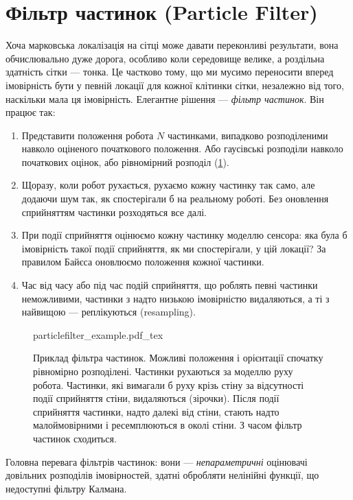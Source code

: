 \section{Фільтр частинок (Particle Filter)}
Хоча марковська локалізація на сітці може давати переконливі результати, вона обчислювально дуже дорога, особливо коли середовище велике, а роздільна здатність сітки — тонка. Це частково тому, що ми мусимо переносити вперед імовірність бути у певній локації для кожної клітинки сітки, незалежно від того, наскільки мала ця імовірність. Елегантне рішення — \emph{фільтр частинок}. Він працює так:
\begin{enumerate}
\item Представити положення робота $N$ частинками, випадково розподіленими навколо оціненого початкового положення. Або гаусівські розподіли навколо початкових оцінок, або рівномірний розподіл (\cref{fig:particlefilter_example}).
\item Щоразу, коли робот рухається, рухаємо кожну частинку так само, але додаючи шум так, як спостерігали б на реальному роботі. Без оновлення сприйняттям частинки розходяться все далі.
\item При події сприйняття оцінюємо кожну частинку моделлю сенсора: яка була б імовірність такої події сприйняття, як ми спостерігали, у цій локації? За правилом Байєса оновлюємо положення кожної частинки.
\item Час від часу або під час подій сприйняття, що роблять певні частинки неможливими, частинки з надто низькою імовірністю видаляються, а ті з найвищою — реплікуються (resampling).
\end{enumerate}

\begin{figure}[!htb]
    \centering
    \def\svgwidth{0.92\textwidth}
    {particlefilter_example.pdf_tex}
    \caption{Приклад фільтра частинок. Можливі положення і орієнтації спочатку рівномірно розподілені. Частинки рухаються за моделлю руху робота. Частинки, які вимагали б руху крізь стіну за відсутності події сприйняття стіни, видаляються (зірочки). Після події сприйняття частинки, надто далекі від стіни, стають надто малоймовірними і ресемплюються в околі стіни. З часом фільтр частинок сходиться.\label{fig:particlefilter_example}}
\end{figure}

Головна перевага фільтрів частинок: вони — \emph{непараметричні} оцінювачі довільних розподілів імовірностей, здатні обробляти нелінійні функції, що недоступні фільтру Калмана.

